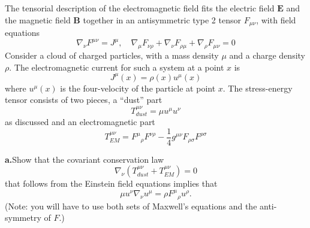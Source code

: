 \begin{exercises}
\begin{xca}
The tensorial description of the electromagnetic field fits the electric field $\mathbf{E}$ and the magnetic field $\mathbf{B}$ together
in an antisymmetric type 2 tensor $F_{\mu\nu}$, with field equations
\begin{equation}
\nabla_{\nu}F^{\mu\nu}=J^{\mu},\quad
\nabla_{\mu}F_{\nu\rho}+
\nabla_{\nu}F_{\rho\mu}+
\nabla_{\rho}F_{\mu\nu}=0
\end{equation}
Consider a cloud of charged particles, with a mass density $\mu$ and a charge density $\rho$. The electromagnetic current for such a system at a point $x$ is
\begin{equation}
J^{\mu} (x) = \rho(x)u^{\mu}(x)
\end{equation}
where $u^{\mu}(x)$ is the four-velocity of the particle at point $x$. The stress-energy
tensor consists of two pieces, a ``dust'' part
\begin{equation}
T^{\mu\nu}_{dust}=\mu u^{\mu}u^{\nu}
\end{equation}
as discussed and an electromagnetic part
\begin{equation}
T^{\mu\nu}_{EM}={F^{\mu}}_{\rho}F^{\nu\rho}-\frac{1}{4}g^{\mu\nu}F_{\rho\sigma}F^{\rho\sigma}
\end{equation}

\noindent\textbf{a.\quad}Show that the covariant conservation law
\begin{equation}
\nabla_{\nu}(T^{\mu\nu}_{dust} + T^{\mu\nu}_{EM}) = 0
\end{equation}
that follows from the Einstein field equations implies that
\begin{equation}
\mu u^{\nu}\nabla_{\nu}u^{\mu}=\rho{F^{\mu}}_{\rho}u^{\rho}.
\end{equation}
(Note: you will have to use both sets of Maxwell's equations and
the anti-symmetry of $F$.) 


\end{xca}
\end{exercises}
